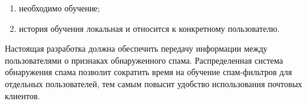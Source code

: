 \begin{enumerate}
\item{необходимо обучение;}
\item{история обучения локальная и относится к конкретному пользователю.}
\end{enumerate}

Настоящая разработка должна обеспечить передачу информации между пользователями о признаках обнаруженного спама. Распределенная система обнаружения спама позволит сократить время на обучение спам-фильтров для отдельных пользователей, тем самым повысит удобство использования почтовых клиентов.


